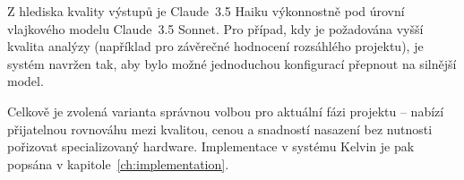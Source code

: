 Z hlediska kvality výstupů je Claude~3.5 Haiku výkonnostně pod úrovní vlajkového modelu Claude~3.5 Sonnet.
Pro případ, kdy je požadována vyšší kvalita analýzy (například pro závěrečné hodnocení rozsáhlého projektu), je systém navržen tak, aby bylo možné jednoduchou konfigurací přepnout na silnější model.

Celkově je zvolená varianta správnou volbou pro aktuální fázi projektu -- nabízí přijatelnou rovnováhu mezi kvalitou, cenou a snadností nasazení bez nutnosti pořizovat specializovaný hardware.
Implementace v systému Kelvin je pak popsána v kapitole~\ref{ch:implementation}.

\endinput
